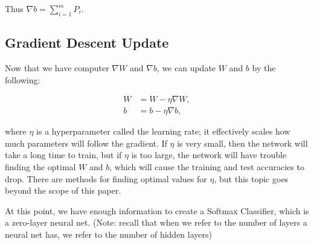 Thus $\nabla b = \sum_{i=1}^m P_i$.

\subsection{Gradient Descent Update}
Now that we have computer $\nabla W$ and $\nabla b$, we can update $W$
and $b$ by the following:

\begin{align*}
W &= W - \eta \nabla W,\\
b &= b - \eta \nabla b, 
\end{align*}

where $\eta$ is a hyperparameter called the learning rate; it effectively
scales how much parameters will follow the gradient. If $\eta$ is very small,
then the network will take a long time to train, but if $\eta$ is too large,
the network will have trouble finding the optimal $W$ and $b$, which will cause
the training and test accuracies to drop. There are methods for finding optimal
values for $\eta$, but this topic goes beyond the scope of this paper.

At this point, we have enough information to create a Softmax Classifier, which is a
zero-layer neural net. (Note: recall that when we refer to the number of layers
a neural net has, we refer to the number of hidden layers)

